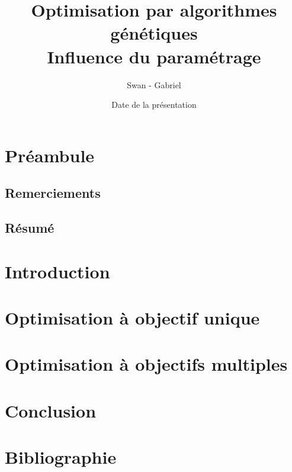 \documentclass[12pt]{report}
\title{Optimisation par algorithmes génétiques
        \\\large Influence du paramétrage}
\author{Swan \bsc{Launay} - Gabriel \bsc{Vaubaillon}}
\date{Date de la présentation}
\begin{document}
\maketitle

\chapter{Préambule}
  \section{Remerciements}
  \section{Résumé}

\chapter{Introduction}

\tableofcontents

\chapter{Optimisation à objectif unique}



\chapter{Optimisation à objectifs multiples}

\chapter{Conclusion}

\chapter{Bibliographie}
\end{document}
